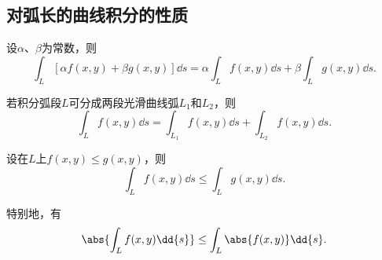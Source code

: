 \subsection{对弧长的曲线积分的性质}
\begin{property}\label{theorem:线积分与面积分.第一类曲线积分性质1}
设\(\alpha\)、\(\beta\)为常数，则\begin{equation*}
	\int_L [\alpha f(x,y) + \beta g(x,y)] \dd{s}
	= \alpha \int_L f(x,y) \dd{s}
	+ \beta \int_L g(x,y) \dd{s}.
\end{equation*}
\end{property}

\begin{property}\label{theorem:线积分与面积分.第一类曲线积分性质2}
若积分弧段\(L\)可分成两段光滑曲线弧\(L_1\)和\(L_2\)，则\begin{equation*}
	\int_L f(x,y) \dd{s}
	=\int_{L_1} f(x,y) \dd{s}
	+\int_{L_2} f(x,y) \dd{s}.
\end{equation*}
\end{property}

\begin{property}\label{theorem:线积分与面积分.第一类曲线积分性质3}
设在\(L\)上\(f(x,y) \leq g(x,y)\)，则\begin{equation*}
	\int_L f(x,y) \dd{s}
	\leq
	\int_L g(x,y) \dd{s}.
\end{equation*}

特别地，有\begin{equation*}
	\abs{\int_L f(x,y) \dd{s}} \leq \int_L \abs{f(x,y)} \dd{s}.
\end{equation*}
\end{property}

